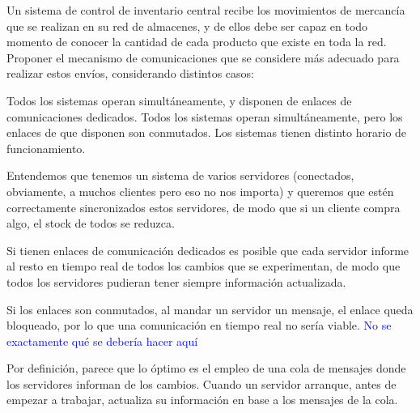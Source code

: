   \begin{problem}[7]
  Un sistema de control de inventario central recibe los movimientos de
mercancía que se realizan en su red de almacenes, y de ellos debe ser capaz en
todo momento de conocer la cantidad de cada producto que existe en toda la red.
Proponer el mecanismo de comunicaciones que se considere más adecuado para
realizar estos envíos, considerando distintos casos:

    \ppart Todos los sistemas operan simultáneamente, y disponen de enlaces de
comunicaciones dedicados.
    \ppart Todos los sistemas operan simultáneamente, pero los enlaces de que disponen
son conmutados.
    \ppart Los sistemas tienen distinto horario de funcionamiento.

    \solution

    \yoP

    Entendemos que tenemos un sistema de varios servidores (conectados, obviamente, a muchos clientes pero eso no nos importa) y queremos que estén correctamente sincronizados estos servidores, de modo que si un cliente compra algo, el stock de todos se reduzca.

    \spart

    Si tienen enlaces de comunicación dedicados es posible que cada servidor informe al resto en tiempo real de todos los cambios que se experimentan, de modo que todos los servidores pudieran tener siempre información actualizada.

    \spart
    Si los enlaces son conmutados, al mandar un servidor un mensaje, el enlace queda bloqueado, por lo que una comunicación en tiempo real no sería viable. \textcolor{blue}{No se exactamente qué se debería hacer aquí}

    \spart

    Por definición, parece que lo óptimo es el empleo de una cola de mensajes donde los servidores informan de los cambios. Cuando un servidor arranque, antes de empezar a trabajar, actualiza su información en base a los mensajes de la cola.

    \end{problem}


